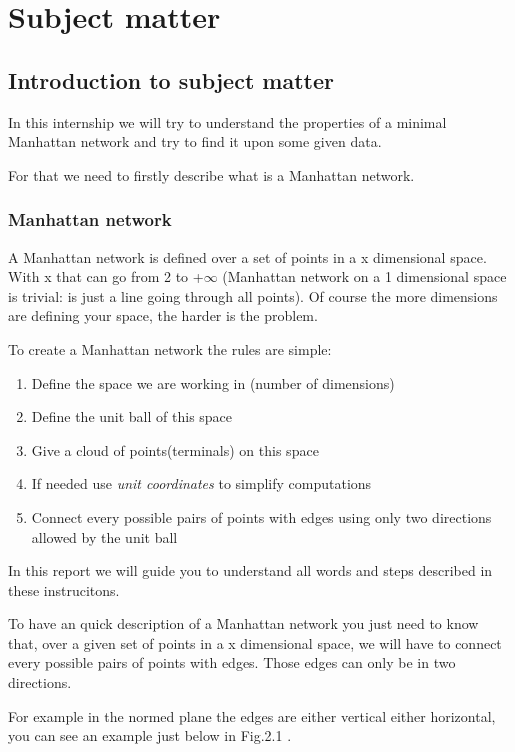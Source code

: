 \chapter{Subject matter}
\section{Introduction to subject matter}%
In this internship we will try to understand the properties of a minimal Manhattan network and try to find it upon some given data.

\noindent For that we need to firstly describe what is a Manhattan network.
\subsection{Manhattan network}
A Manhattan network is defined over a set of points in a x dimensional space. With x that can go from 2 to +$\infty$ (Manhattan network on a 1 dimensional space is trivial: is just a line going through all points). Of course the more dimensions are defining your space, the harder is the problem.\newline


\noindent To create a Manhattan network the rules are simple:
\begin{enumerate}
	\item{Define the space we are working in (number of dimensions)}
	\item{Define the unit ball of this space}
	\item{Give a cloud of points(terminals) on this space}
	\item{If needed use \emph{unit coordinates} to simplify computations}
	\item{Connect every possible pairs of points with edges using only two directions allowed by the unit ball}
\end{enumerate}
	In this report we will guide you to understand all words and steps described in these instrucitons. 
	
	To have an quick description of a Manhattan network you just need to know that, over a given set of points in a x dimensional space, we will have to connect every possible pairs of points with edges. Those edges can only be in two directions. 
	
	For example in the normed plane the edges are either vertical either horizontal, you can see an example just below in Fig.2.1 . 
	

